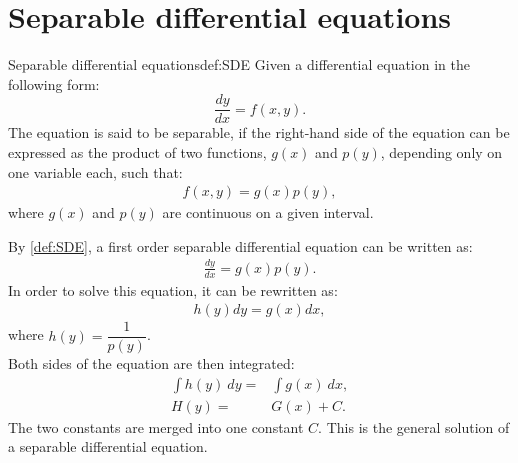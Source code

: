 \section{Separable differential equations}\label{SepDiff}
\begin{definition}{Separable differential equations}{def:SDE}
Given a differential equation in the following form: 
$$\frac{dy}{dx} = f(x,y).$$
The equation is said to be separable, if the right-hand side of the equation can be expressed as the product of two functions, $g(x)$ and $p(y)$, depending only on one variable each, such that:
\begin{align*}
f(x,y)=g(x)p(y),
\end{align*}
where $g(x)$ and $p(y)$ are continuous on a given interval.
\end{definition}
\noindent
By \cref{def:SDE}, a first order separable differential equation can be written as:
\begin{align*}
	\frac{dy}{dx}=g(x)p(y).
\end{align*}
In order to solve this equation, it can be rewritten as:
\begin{align*}
	h(y)dy=g(x)dx,
\end{align*}
where $h(y) = \dfrac{1}{p(y)}$.\\
Both sides of the equation are then integrated:
\begin{align}
\int h(y)\ dy =&\int g(x)\ dx, \nonumber  \\
H(y)=&G(x)+C. \label{SDEG}
\end{align}
The two constants are merged into one constant $C$. This is the general solution of a separable differential equation. 


